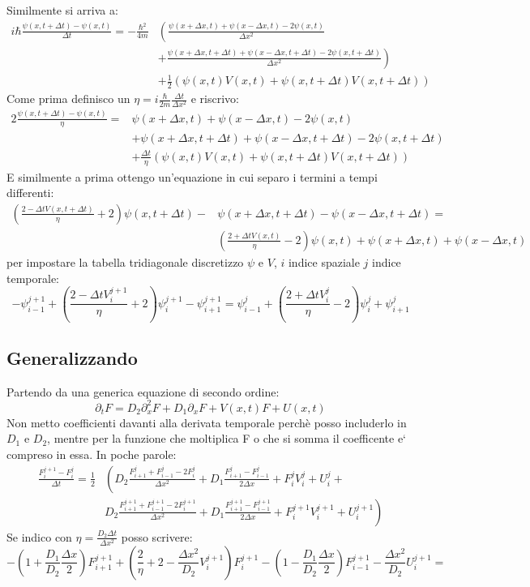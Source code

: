 \documentclass[]{article}
\newcommand{\lr}[3]{\ensuremath{\left#1 #3 \right#2}}
\newcommand{\lrt}[1]{\lr{(}{)}{#1}}
\numberwithin{equation}{subsection}
\begin{document}
Similmente si arriva  a:
$$\begin{aligned}
i\hbar\frac{\psi(x,t+\Delta t)-\psi(x,t)}{\Delta t} = -\frac{\hbar^2}{4m} &\lr(.{\frac{\psi(x+\Delta x,t)+\psi(x-\Delta x,t)-2\psi(x,t)}{\Delta x^2}}\\
&\lr.){+\frac{\psi(x+\Delta x,t+\Delta t)+\psi(x-\Delta x,t+\Delta t)-2\psi(x,t+\Delta t)}{\Delta x^2}}\\
&+ \frac 12\lrt{\psi(x,t)V(x,t)+ \psi(x,t+\Delta t)V(x,t+\Delta t)}
\end{aligned}$$
Come prima definisco un $\eta = i\frac{\hbar}{2m} \frac{\Delta t}{\Delta x^2} $ e riscrivo:
$$\begin{aligned}
2\frac{\psi(x,t+\Delta t)-\psi(x,t)}{\eta} = & \psi(x+\Delta x,t)+\psi(x-\Delta x,t)-2\psi(x,t)\\
&+\psi(x+\Delta x,t+\Delta t)+\psi(x-\Delta x,t+\Delta t)-2\psi(x,t+\Delta t)\\
&+ \frac {\Delta t}\eta\lrt{\psi(x,t)V(x,t)+ \psi(x,t+\Delta t)V(x,t+\Delta t)}
\end{aligned}$$
E similmente a  prima ottengo un'equazione in cui separo i termini a tempi differenti:
$$\begin{aligned}
\lrt{\frac{2-\Delta t V(x,t+\Delta t)}{\eta}+2}\psi(x,t+\Delta t) -&\psi(x+\Delta x,t+\Delta t)-\psi(x-\Delta x,t+\Delta t) =\\
& \lrt{\frac{2+\Delta t V(x,t)}{\eta}-2}\psi(x,t) +\psi(x+\Delta x,t)+\psi(x-\Delta x,t)
\end{aligned}$$
per impostare la tabella tridiagonale discretizzo $\psi$ e $V$, $i$ indice spaziale $j$ indice temporale:
$$
-\psi_{i-1}^{j+1}+\lrt{\frac{2-\Delta t V_i^{j+1}}{\eta}+2}\psi_{i}^{j+1} -\psi_{i+1}^{j+1} = 
\psi_{i-1}^{j}+\lrt{\frac{2+ \Delta t V_{i}^{j}}{\eta}-2}\psi_{i}^{j} +\psi_{i+1}^{j}
$$
\subsection{Generalizzando}
Partendo da una generica equazione di secondo ordine:
$$
\partial_t F = D_2 \partial^2_x F + D_1 \partial_x F + V(x,t) F + U(x,t)
$$
Non metto coefficienti davanti alla derivata temporale perch\`e posso includerlo in $D_1$ e $D_2$, mentre per la funzione che moltiplica F o che si somma il coefficente e` compreso in essa.
In poche parole:
$$\begin{aligned}
\frac{F_i^{j+1} - F_i^j}{\Delta t} = \frac 12&\lr(.{D_2\frac{F^j_{i+1}+F^{j}_{i-1}-2F_i^{j}}{\Delta x^2} + D_1\frac{F^j_{i+1}-F^{j}_{i-1}}{2\Delta x} + F_i^j V_i^j + U_i^j+}\\
&\lr.){D_2\frac{F^{j+1}_{i+1}+F^{j+1}_{i-1}-2F_i^{j+1}}{\Delta x^2} + D_1\frac{F^{j+1}_{i+1}-F^{j+1}_{i-1}}{2\Delta x} + F_i^{j+1} V_i^{j+1} + U_i^{j+1}}
\end{aligned}
$$
Se indico con $\eta = \frac {D_2 \Delta t}{\Delta x^2}$ posso scrivere:
$$
-\lrt{1+\frac{D_1}{D_2}\frac{\Delta x}2}F_{i+1}^{j+1} + \lrt{\frac2\eta +2- \frac{\Delta x^2}{D_2}V_i^{j+1}} F^{j+1}_i - \lrt{1-\frac{D_1}{D_2}\frac{\Delta x}2}F_{i-1}^{j+1}  - \frac{\Delta x^2}{D_2} U_i^{j+1} = 
$$
\end{document}
